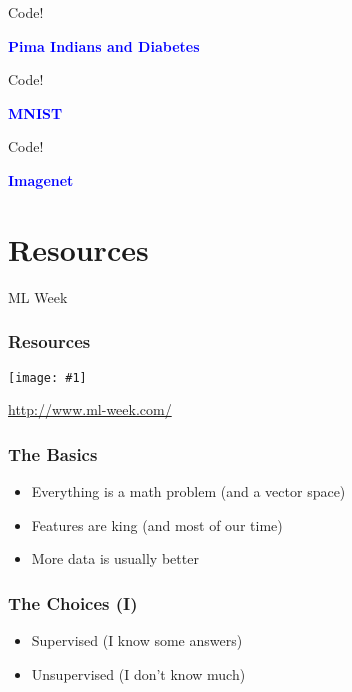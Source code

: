 \documentclass{beamer}
\newcommand\blue[1]{\textcolor{blue}{#1}}
\newcommand\cimggg[1]{\vfill\centerline{\texttt{[image: \#1]}}\vfill}
\newcommand\vphrase[1]{\vfill\centerline{\large\bf\blue{#1}}\vfill}
\begin{document}
\begin{frame}{Code!}
  \vphrase{Pima Indians and Diabetes}
\end{frame}

\begin{frame}{Code!}
  \vphrase{MNIST}
\end{frame}

\begin{frame}{Code!}
  \vphrase{Imagenet}
\end{frame}

  


\section{Resources}
\label{sec:resources}

\begin{frame}{ML Week}
  \frametitle{Resources}
  \cimggg{ml-week.png}

  \vspace{5mm}
  \centerline{\url{http://www.ml-week.com/}}
\end{frame}

\begin{frame}
  \frametitle{The Basics}

  \begin{itemize}
  \item Everything is a math problem (and a vector space)
  \item Features are king (and most of our time)
  \item More data is usually better
  \end{itemize}
\end{frame}

\begin{frame}
  \frametitle{The Choices (I)}
    
  \begin{itemize}
  \item Supervised (I know some answers)
  \item Unsupervised (I don't know much)
  \end{itemize}
\end{frame}
\end{document}

